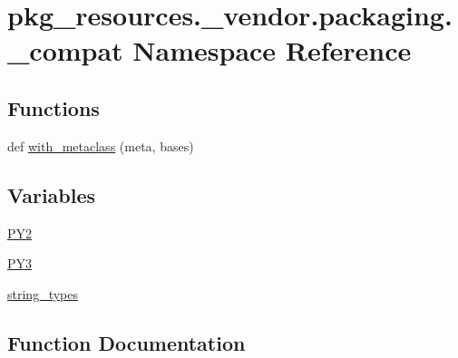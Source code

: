 \hypertarget{namespacepkg__resources_1_1__vendor_1_1packaging_1_1__compat}{}\section{pkg\+\_\+resources.\+\_\+vendor.\+packaging.\+\_\+compat Namespace Reference}
\label{namespacepkg__resources_1_1__vendor_1_1packaging_1_1__compat}
\subsection*{Functions}
\begin{DoxyCompactItemize}
\item 
def \hyperlink{namespacepkg__resources_1_1__vendor_1_1packaging_1_1__compat_abafe60c9896ed27f5eed44e77a4495bf}{with\+\_\+metaclass} (meta, bases)
\end{DoxyCompactItemize}
\subsection*{Variables}
\begin{DoxyCompactItemize}
\item 
\hyperlink{namespacepkg__resources_1_1__vendor_1_1packaging_1_1__compat_a29af81cbfc3051c8300e364d1c793fa2}{P\+Y2}
\item 
\hyperlink{namespacepkg__resources_1_1__vendor_1_1packaging_1_1__compat_a9b3eb224572f7d2efd0093e0582dee85}{P\+Y3}
\item 
\hyperlink{namespacepkg__resources_1_1__vendor_1_1packaging_1_1__compat_af58c8be5dbd0ce510c7b351c3653ec29}{string\+\_\+types}
\end{DoxyCompactItemize}


\subsection{Function Documentation}
\mbox{\label{namespacepkg__resources_1_1__vendor_1_1packaging_1_1__compat_abafe60c9896ed27f5eed44e77a4495bf}} 

